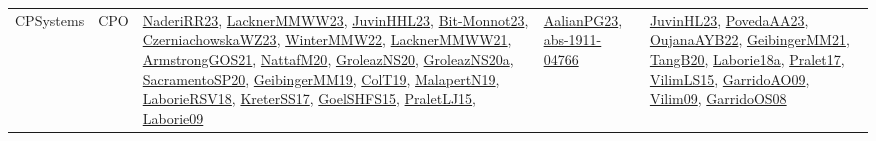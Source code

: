 {\begin{longtable}{lp{3cm}>{\raggedright}p{6cm}>{\raggedright}p{6cm}p{8cm}}
CPSystems & CPO & \href{articles/NaderiRR23.pdf}{NaderiRR23}\cite{NaderiRR23}, \href{articles/LacknerMMWW23.pdf}{LacknerMMWW23}\cite{LacknerMMWW23}, \href{papers/JuvinHHL23.pdf}{JuvinHHL23}\cite{JuvinHHL23}, \href{papers/Bit-Monnot23.pdf}{Bit-Monnot23}\cite{Bit-Monnot23}, \href{articles/CzerniachowskaWZ23.pdf}{CzerniachowskaWZ23}\cite{CzerniachowskaWZ23}, \href{papers/WinterMMW22.pdf}{WinterMMW22}\cite{WinterMMW22}, \href{papers/LacknerMMWW21.pdf}{LacknerMMWW21}\cite{LacknerMMWW21}, \href{papers/ArmstrongGOS21.pdf}{ArmstrongGOS21}\cite{ArmstrongGOS21}, \href{papers/NattafM20.pdf}{NattafM20}\cite{NattafM20}, \href{papers/GroleazNS20.pdf}{GroleazNS20}\cite{GroleazNS20}, \href{papers/GroleazNS20a.pdf}{GroleazNS20a}\cite{GroleazNS20a}, \href{articles/SacramentoSP20.pdf}{SacramentoSP20}\cite{SacramentoSP20}, \href{papers/GeibingerMM19.pdf}{GeibingerMM19}\cite{GeibingerMM19}, \href{papers/ColT19.pdf}{ColT19}\cite{ColT19}, \href{papers/MalapertN19.pdf}{MalapertN19}\cite{MalapertN19}, \href{articles/LaborieRSV18.pdf}{LaborieRSV18}\cite{LaborieRSV18}, \href{articles/KreterSS17.pdf}{KreterSS17}\cite{KreterSS17}, \href{articles/GoelSHFS15.pdf}{GoelSHFS15}\cite{GoelSHFS15}, \href{papers/PraletLJ15.pdf}{PraletLJ15}\cite{PraletLJ15}, \href{papers/Laborie09.pdf}{Laborie09}\cite{Laborie09} & \href{papers/AalianPG23.pdf}{AalianPG23}\cite{AalianPG23}, \href{articles/abs-1911-04766.pdf}{abs-1911-04766}\cite{abs-1911-04766} & \href{papers/JuvinHL23.pdf}{JuvinHL23}\cite{JuvinHL23}, \href{papers/PovedaAA23.pdf}{PovedaAA23}\cite{PovedaAA23}, \href{papers/OujanaAYB22.pdf}{OujanaAYB22}\cite{OujanaAYB22}, \href{papers/GeibingerMM21.pdf}{GeibingerMM21}\cite{GeibingerMM21}, \href{papers/TangB20.pdf}{TangB20}\cite{TangB20}, \href{papers/Laborie18a.pdf}{Laborie18a}\cite{Laborie18a}, \href{papers/Pralet17.pdf}{Pralet17}\cite{Pralet17}, \href{papers/VilimLS15.pdf}{VilimLS15}\cite{VilimLS15}, \href{articles/GarridoAO09.pdf}{GarridoAO09}\cite{GarridoAO09}, \href{papers/Vilim09.pdf}{Vilim09}\cite{Vilim09}, \href{articles/GarridoOS08.pdf}{GarridoOS08}\cite{GarridoOS08}\\

\end{longtable}}
